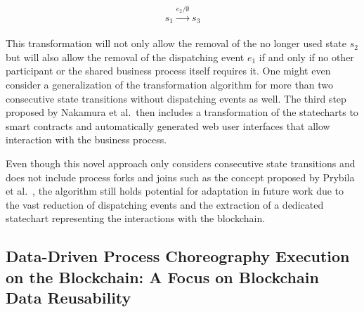 \begin{equation}
    s_1 \xrightarrow[]{e_2/\emptyset} s_3
    \label{eq:consecutive_state_transitions_without_dispatching_events_reduced}
\end{equation}

This transformation will not only allow the removal of the no longer used state $s_2$ but will also allow the removal of the dispatching event $e_1$ if and only if no other participant or the shared business process itself requires it. One might even consider a generalization of the transformation algorithm for more than two consecutive state transitions without dispatching events as well. The third step proposed by Nakamura et al.\ then includes a transformation of the statecharts to smart contracts and automatically generated web user interfaces that allow interaction with the business process.

Even though this novel approach only considers consecutive state transitions and does not include process forks and joins such as the concept proposed by Prybila et al.~\cite{runtime_verification_for_bp_utilizing_bitcoin,prybila_master_thesis}, the algorithm still holds potential for adaptation in future work due to the vast reduction of dispatching events and the extraction of a dedicated statechart representing the interactions with the blockchain.


\subsection{Data-Driven Process Choreography Execution on the Blockchain: A Focus on Blockchain Data Reusability~\cite{data_driven_choreography_data_reusability_lichtenstein}}

